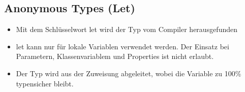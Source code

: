 \subsection{Anonymous Types (Let)}
\begin{itemize}
  \itemsep -0.5em 
  \item Mit dem Schlüsselwort let wird der Typ vom Compiler herausgefunden
  \item  let kann nur für lokale Variablen verwendet werden. Der Einsatz bei Parametern, Klassenvariablem und Properties ist nicht erlaubt.
  \item Der Typ wird aus der Zuweisung abgeleitet, wobei die Variable zu 100\% typensicher bleibt.
\end{itemize}


\pagebreak

